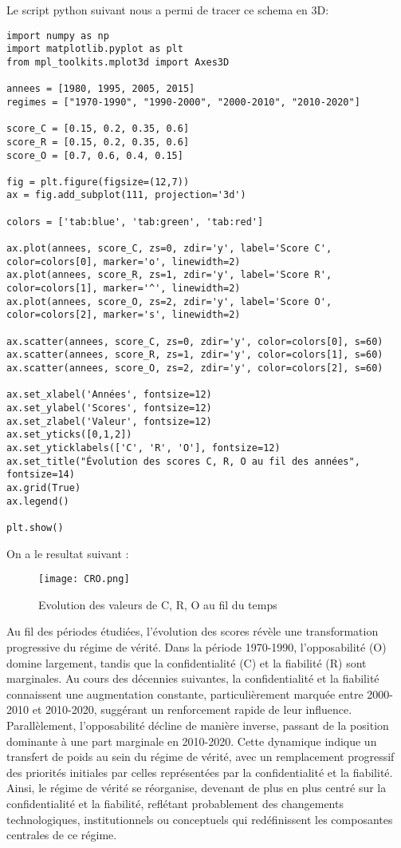 \documentclass[11pt,a4paper]{article}
\begin{document}
Le script python suivant nous a permi de tracer ce schema en 3D: 

\begin{lstlisting}[style=pythonstyle, caption={Visualisation 3D des scores}, label={lst:3d_scores}]
import numpy as np
import matplotlib.pyplot as plt
from mpl_toolkits.mplot3d import Axes3D

annees = [1980, 1995, 2005, 2015]
regimes = ["1970-1990", "1990-2000", "2000-2010", "2010-2020"]

score_C = [0.15, 0.2, 0.35, 0.6]
score_R = [0.15, 0.2, 0.35, 0.6]
score_O = [0.7, 0.6, 0.4, 0.15]

fig = plt.figure(figsize=(12,7))
ax = fig.add_subplot(111, projection='3d')

colors = ['tab:blue', 'tab:green', 'tab:red']

ax.plot(annees, score_C, zs=0, zdir='y', label='Score C', color=colors[0], marker='o', linewidth=2)
ax.plot(annees, score_R, zs=1, zdir='y', label='Score R', color=colors[1], marker='^', linewidth=2)
ax.plot(annees, score_O, zs=2, zdir='y', label='Score O', color=colors[2], marker='s', linewidth=2)

ax.scatter(annees, score_C, zs=0, zdir='y', color=colors[0], s=60)
ax.scatter(annees, score_R, zs=1, zdir='y', color=colors[1], s=60)
ax.scatter(annees, score_O, zs=2, zdir='y', color=colors[2], s=60)

ax.set_xlabel('Années', fontsize=12)
ax.set_ylabel('Scores', fontsize=12)
ax.set_zlabel('Valeur', fontsize=12)
ax.set_yticks([0,1,2])
ax.set_yticklabels(['C', 'R', 'O'], fontsize=12)
ax.set_title("Évolution des scores C, R, O au fil des années", fontsize=14)
ax.grid(True)
ax.legend()

plt.show()
\end{lstlisting}
On a le resultat suivant : 

\begin{figure}[H]
    \centering
    \texttt{[image: CRO.png]}
    \caption{Evolution des valeurs de C, R, O au fil du temps}
    \label{fig:CRO}
\end{figure}

Au fil des périodes étudiées, l’évolution des scores révèle une transformation progressive du régime de vérité. Dans la période 1970-1990, l’opposabilité (O) domine largement, tandis que la confidentialité (C) et la fiabilité (R) sont marginales. Au cours des décennies suivantes, la confidentialité et la fiabilité connaissent une augmentation constante, particulièrement marquée entre 2000-2010 et 2010-2020, suggérant un renforcement rapide de leur influence. Parallèlement, l’opposabilité décline de manière inverse, passant de la position dominante à une part marginale en 2010-2020. Cette dynamique indique un transfert de poids au sein du régime de vérité, avec un remplacement progressif des priorités initiales par celles représentées par la confidentialité et la fiabilité. Ainsi, le régime de vérité se réorganise, devenant de plus en plus centré sur la confidentialité et la fiabilité, reflétant probablement des changements technologiques, institutionnels ou conceptuels qui redéfinissent les composantes centrales de ce régime.
\end{document}
